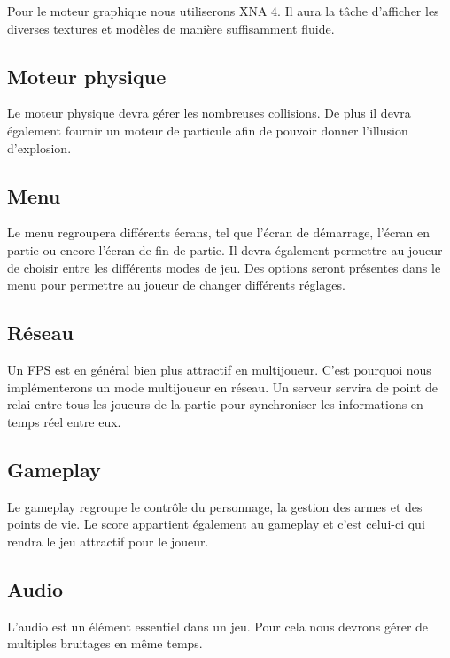 \documentclass[a4paper, 11pt]{report}
\begin{document}
Pour le moteur graphique nous utiliserons XNA 4. Il aura la tâche d'afficher les diverses textures et modèles de manière suffisamment fluide.

\subsection{Moteur physique}\label{moteur-physique}

Le moteur physique devra gérer les nombreuses collisions. De plus il devra également fournir un moteur de particule afin de pouvoir donner l'illusion d'explosion.

\subsection{Menu}\label{menu}

Le menu regroupera différents écrans, tel que l'écran de démarrage, l'écran en partie ou encore l'écran de fin de partie. Il devra également permettre au joueur de choisir entre les différents modes de jeu. Des options seront présentes dans le menu pour permettre au joueur de changer différents réglages.

\subsection{Réseau}\label{ruxe9seau}

Un FPS est en général bien plus attractif en multijoueur. C'est pourquoi nous implémenterons un mode multijoueur en réseau. Un serveur servira de point de relai entre tous les joueurs de la partie pour synchroniser les informations en temps réel entre eux.

\subsection{Gameplay}\label{gameplay}

Le gameplay regroupe le contrôle du personnage, la gestion des armes et des points de vie. Le score appartient également au gameplay et c'est celui-ci qui rendra le jeu attractif pour le joueur.

\subsection{Audio}\label{audio}

L'audio est un élément essentiel dans un jeu. Pour cela nous devrons gérer de multiples bruitages en même temps.
\end{document}
